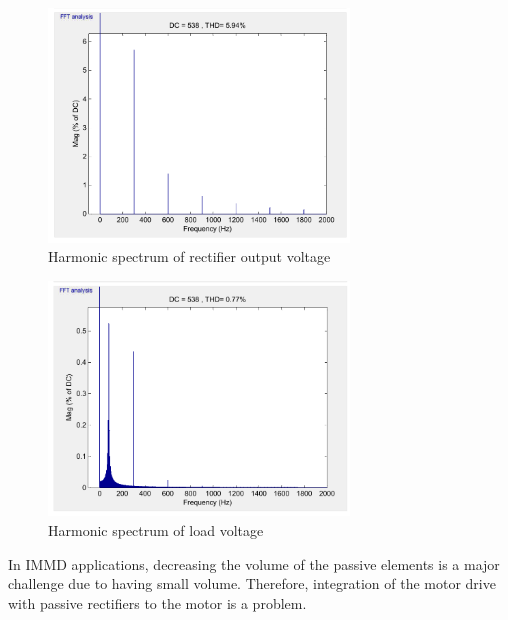\documentclass[conference,a4paper,twocolumn]{IEEEtran}
\begin{document}
\begin{figure}[htp]
  \centering
  \includegraphics[width=8cm]{images/fft1}
  \caption{Harmonic spectrum of rectifier output voltage}
  \label{fig:fft1}
\end{figure}
\begin{figure}[h]
  \centering
  \includegraphics[width=8cm]{images/fft2}
  \caption{Harmonic spectrum of load voltage}
  \label{fig:fft2}
\end{figure}

In IMMD applications, decreasing the volume of the passive elements is a major challenge due to having small volume. Therefore, integration of the motor drive with passive rectifiers to the motor is a problem.

\end{document}
